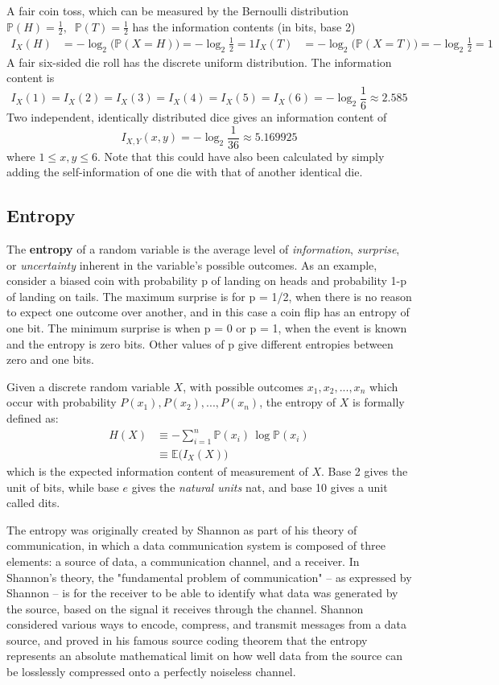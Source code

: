 \documentclass{article}
\begin{document}
  A fair coin toss, which can be measured by the Bernoulli distribution $\mathbb{P}(H) = \frac{1}{2}, \;\; \mathbb{P}(T) = \frac{1}{2}$ has the information contents (in bits, base 2) 
  \begin{align*}
      I_X (H) & = - \log_2 \big( \mathbb{P}(X = H)\big) = - \log_2 \frac{1}{2} = 1 
      I_X (T) & = - \log_2 \big( \mathbb{P}(X = T)\big) = - \log_2 \frac{1}{2} = 1 
  \end{align*}
  A fair six-sided die roll has the discrete uniform distribution. The information content is 
  \[I_X (1) = I_X (2) = I_X (3) = I_X (4) = I_X (5) = I_X (6) = -\log_2 \frac{1}{6} \approx 2.585\]
  Two independent, identically distributed dice gives an information content of 
  \[I_{X, Y} (x, y) = -\log_2 \frac{1}{36} \approx 5.169925\]
  where $1 \leq x, y \leq 6$. Note that this could have also been calculated by simply adding the self-information of one die with that of another identical die.

  \subsection{Entropy}
  The \textbf{entropy} of a random variable is the average level of \textit{information}, \textit{surprise}, or \textit{uncertainty} inherent in the variable's possible outcomes. As an example, consider a biased coin with probability p of landing on heads and probability 1-p of landing on tails. The maximum surprise is for p = 1/2, when there is no reason to expect one outcome over another, and in this case a coin flip has an entropy of one bit. The minimum surprise is when p = 0 or p = 1, when the event is known and the entropy is zero bits. Other values of p give different entropies between zero and one bits.

  Given a discrete random variable $X$, with possible outcomes $x_1, x_2, ..., x_n$ which occur with probability $P(x_1), P(x_2), ..., P(x_n)$, the entropy of $X$ is formally defined as: 
  \begin{align*}
      H(X) & \equiv - \sum_{i=1}^n \mathbb{P}(x_i) \, \log \mathbb{P}(x_i) \\
      & \equiv \mathbb{E}\big(I_X (X)\big)
  \end{align*}
  which is the expected information content of measurement of $X$. Base 2 gives the unit of bits, while base $e$ gives the \textit{natural units} nat, and base 10 gives a unit called dits. 

  The entropy was originally created by Shannon as part of his theory of communication, in which a data communication system is composed of three elements: a source of data, a communication channel, and a receiver. In Shannon's theory, the "fundamental problem of communication" – as expressed by Shannon – is for the receiver to be able to identify what data was generated by the source, based on the signal it receives through the channel. Shannon considered various ways to encode, compress, and transmit messages from a data source, and proved in his famous source coding theorem that the entropy represents an absolute mathematical limit on how well data from the source can be losslessly compressed onto a perfectly noiseless channel. 
\end{document}
